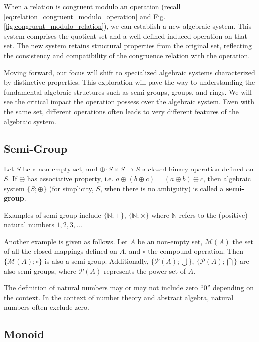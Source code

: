 When a relation is congruent modulo an operation (recall \eqref{eq:relation_congruent_modulo_operation} and Fig. \ref{fig:congruent_modulo_relation}), we can establish a new algebraic system. This system comprises the quotient set and a well-defined induced operation on that set. The new system retains structural properties from the original set, reflecting the consistency and compatibility of the congruence relation with the operation.

Moving forward, our focus will shift to specialized algebraic systems characterized by distinctive properties. This exploration will pave the way to understanding the fundamental algebraic structures such as semi-groups, groups, and rings. We will see the critical impact the operation possess over the algebraic system. Even with the same set, different operations often leads to very different features of the algebraic system.

\subsection{Semi-Group}

Let $S$ be a non-empty set, and $\oplus: S\times S \rightarrow S$ a closed binary operation defined on $S$. If $\oplus$ has associative property, i.e. $a\oplus(b\oplus c) = (a \oplus b) \oplus c$, then algebraic system $\{S; \oplus\}$ (for simplicity, $S$, when there is no ambiguity) is called a \textbf{semi-group}.

Examples of semi-group include $\{\mathbb{N}; +\}$, $\{\mathbb{N}; \times\}$ where $\mathbb{N}$ refers to the (positive) natural numbers $1, 2, 3, \ldots$ 

Another example is given as follows. Let $A$ be an non-empty set, $\mathcal{M}(A)$ the set of all the closed mappings defined on $A$, and $\circ$ the compound operation. Then $\{\mathcal{M}(A); \circ\}$ is also a semi-group. Additionally, $\{\mathcal{P}(A); \bigcup\}$, $\{\mathcal{P}(A); \bigcap\}$ are also semi-groups, where $\mathcal{P}(A)$ represents the power set of $A$.

\begin{shortbox}
The definition of natural numbers may or may not include zero ``$0$'' depending on the context. In the context of number theory and abstract algebra, natural numbers often exclude zero.
\end{shortbox}

\subsection{Monoid}


